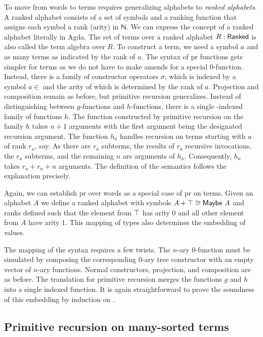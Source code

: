\documentclass{jfp}
\newcommand\Nat{ℕ}
\begin{document}
To move from words to terms requires generalizing alphabets to
\emph{ranked alphabets}. A ranked alphabet consists of a set of
symbols and a ranking function that assigns each symbol a rank (arity) in \Nat.
We can express the concept of a ranked alphabet literally in Agda. 
\PRTreesRanked
The set of terms over a ranked alphabet $R : \ARanked$ is also called the term algebra over $R$.
To construct a term, we need a symbol $a$ and as many terms as indicated by the rank of $a$.
\PRTreesTerm
The syntax of pr functions gets simpler for terms as we do not have to make amends for a special $0$-function.
Instead, there is a family of constructor operators $σ$, which is indexed by a symbol $a∈$ and the arity of which is determined by the rank of $a$. Projection and composition remain as before, but primitive recursion generalizes.
Instead of distinguishing between $g$-functions and $h$-functions, there is a single -indexed family of functions $h$.
The function constructed by primitive recursion on the family $h$ takes $n+1$ arguments with the first argument being the designated recursion argument.
The function $h_a$ handles recursion on terms starting with $a$ of rank $r_a$, say.
As there are $r_a$ subterms, the results of $r_a$ recursive invocations, the $r_a$ subterms, and the remaining $n$ are arguments of $h_a$.
Consequently, $h_a$ takes $r_a + r_a + n$ arguments.
\PRTreesDefinition
The definition of the semantics follows the explanation precisely.

Again, we can establish pr over words as a special case of pr on
terms. Given an alphabet $A$ we define a ranked alphabet with symbols
$A + \ATop \cong \text{\AMaybe{A}}$ and ranks defined such that the element
from $\ATop$ has arity $0$ and all other element from $A$ have arity
$1$. This mapping of types also determines the embedding of values.

\PRWordsToTreesEncodingRanks
The mapping of the syntax requires a few twists.
The $n$-ary $0$-function must be simulated by composing the corresponding $0$-ary tree constructor with an empty vector of $n$-ary functions.
Normal constructors, projection, and composition are as before.
The translation for primitive recursion merges the functions $g$ and $h$ into a single indexed function.
\PRWordsToTreesEncoding
It is again straightforward to prove the soundness of this embedding
by induction on .
\PRWordsToTreesEncodingSound

\subsection{Primitive recursion on many-sorted terms}
\label{sec:prim-recurs-sort}
\end{document}
